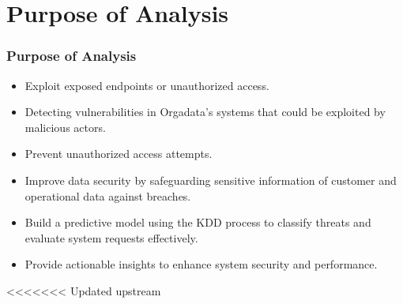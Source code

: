 \documentclass[10pt, a4paper]{beamer}
\begin{document}
	
	
	\section{Purpose of Analysis}
	\begin{frame}
		\frametitle{Purpose of Analysis}
		
		\begin{block}{}
			\begin{itemize}
				\item Exploit exposed endpoints or unauthorized access.
				\item Detecting vulnerabilities in Orgadata's systems that could be exploited by malicious actors.
				\item Prevent unauthorized access attempts.
				\item Improve data security by safeguarding sensitive information of customer and operational data against breaches.
				\item Build a predictive model using the KDD process to classify threats and evaluate system requests effectively.
				\item Provide actionable insights to enhance system security and performance.
			\end{itemize}
		\end{block}
		
	\end{frame}
	
	
<<<<<<< Updated upstream
\end{document}
